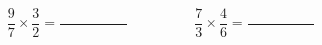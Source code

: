 
\question \[ \frac{9}{7} \times \frac{3}{2} = \frac{\hspace{2cm}}{\hspace{2cm}} 
             \hspace{2cm}
             \frac{7}{3} \times \frac{4}{6} = \frac{\hspace{2cm}}{\hspace{2cm}}
          \]
